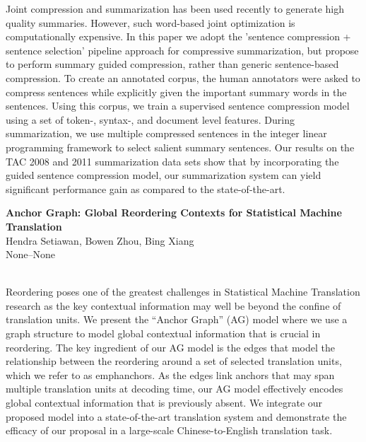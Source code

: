\documentclass[twoside,makeidx]{book}
\begin{document}
\nopagebreak%
\noindent%
{\small Joint compression and summarization has been used recently to generate high quality summaries. However, such word-based joint optimization is computationally expensive. In this paper we adopt the 'sentence compression + sentence selection' pipeline approach for compressive summarization, but propose to perform summary guided compression, rather than generic sentence-based compression. To create an annotated corpus, the human annotators were asked to compress sentences while explicitly given the important summary words in the sentences. Using this corpus, we train a supervised sentence compression model using a set of token-, syntax-, and document level features. During summarization, we use multiple compressed sentences in the integer linear programming framework to select salient summary sentences. Our results on the TAC 2008 and 2011 summarization data sets show that by incorporating the guided sentence compression model, our summarization system can yield significant performance gain as compared to the state-of-the-art.}
\par\vspace{2em}\noindent%
\begin{minipage}{\linewidth}%
\begin{center}
\textbf{\normalsize Anchor Graph: Global Reordering Contexts for Statistical Machine Translation}\\
\normalsize  Hendra Setiawan,  Bowen Zhou,  Bing Xiang\\
{\small None--None}\\
\end{center}
\end{minipage}\\[0.5em]
\nopagebreak%
\noindent%
{\small Reordering poses one of the greatest challenges in Statistical Machine Translation research as the key contextual information may well be beyond the confine of translation units. We present the ``Anchor Graph'' (AG) model where we use a graph structure to model global contextual information that is crucial in reordering. The key ingredient of our AG model is the edges that model the relationship between the reordering around a set of selected translation units, which we refer to as  emph{anchors}. As the edges link anchors that may span multiple translation units at decoding time, our AG model effectively encodes global contextual information that is previously absent. We integrate our proposed model into a state-of-the-art translation system and demonstrate the efficacy of our proposal in a large-scale Chinese-to-English translation task.}
\end{document}
